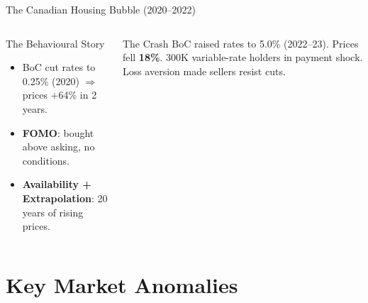 \documentclass[aspectratio=169]{beamer}
\begin{document}
\begin{frame}{The Canadian Housing Bubble (2020--2022)}
\begin{columns}
\begin{block}{The Behavioural Story}
\begin{itemize}\small
  \item BoC cut rates to 0.25\% (2020) $\Rightarrow$ prices $+$64\% in 2 years.
  \item \textbf{FOMO}: bought above asking, no conditions.
  \item \textbf{Availability + Extrapolation}: 20 years of rising prices.
\end{itemize}
\end{block}
\begin{alertblock}{The Crash}
\small BoC raised rates to 5.0\% (2022--23). Prices fell \textbf{18\%}. 300K variable-rate holders in payment shock. Loss aversion made sellers resist cuts.
\end{alertblock}
\end{columns}
\end{frame}

\section{Key Market Anomalies}
\end{document}
